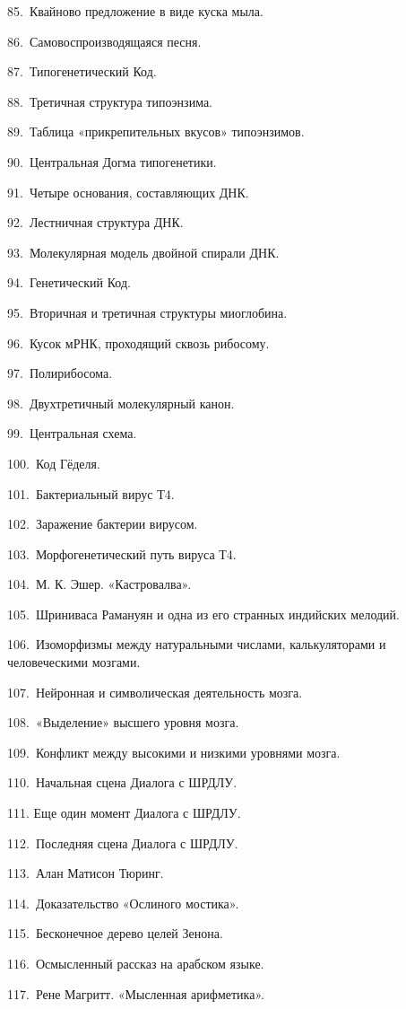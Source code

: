 85.~Квайново предложение в виде куска мыла.

86.~Самовоспроизводящаяся песня.

87.~Типогенетический Код.

88.~Третичная структура типоэнзима.

89.~Таблица «прикрепительных вкусов» типоэнзимов.

90.~Центральная Догма типогенетики.

91.~Четыре основания, составляющих ДНК.

92.~Лестничная структура ДНК.

93.~Молекулярная модель двойной спирали ДНК.

94.~Генетический Код.

95.~Вторичная и третичная структуры миоглобина.

96.~Кусок мРНК, проходящий сквозь рибосому.

97.~Полирибосома.

98.~Двухтретичный молекулярный канон.

99.~Центральная схема.

100.~Код Гёделя.

101.~Бактериальный вирус Т4.

102.~Заражение бактерии вирусом.

103.~Морфогенетический путь вируса Т4.

104.~М. К. Эшер. «Кастровалва».

105.~Шриниваса Рамануян и одна из его странных индийских мелодий.

106.~Изоморфизмы между натуральными числами, калькуляторами и человеческими мозгами.

107.~Нейронная и символическая деятельность мозга.

108.~«Выделение» высшего уровня мозга.

109.~Конфликт между высокими и низкими уровнями мозга.

110.~Начальная сцена Диалога с ШРДЛУ.

111. Еще один момент Диалога с ШРДЛУ.

112.~Последняя сцена Диалога с ШРДЛУ.

113.~Алан Матисон Тюринг.

114.~Доказательство «Ослиного мостика».

115.~Бесконечное дерево целей Зенона.

116.~Осмысленный рассказ на арабском языке.

117.~Рене Магритт. «Мысленная арифметика».

